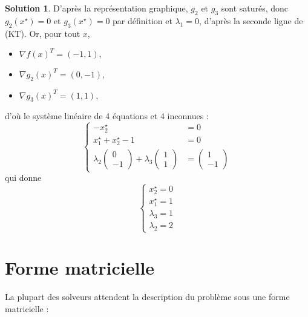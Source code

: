 \documentclass[a4paper,francais]{article}
\theoremstyle{definition}
\newtheorem*{solution}{Solution}
\begin{document}
\begin{solution}
  D'après la représentation graphique, $g_2$ et $g_3$ sont saturés, donc
  $g_2(x^\star) = 0$ et $g_3(x^\star) = 0$ par définition et $\lambda_1 = 0$,
  d'après la seconde ligne de (KT). Or, pour tout $x$,
  \begin{itemize}
  \item ${{\nabla f}(x)}^T = (-1,1)$,
  \item ${{\nabla g_2}(x)}^T = (0,-1)$,
  \item ${{\nabla g_3}(x)}^T = (1,1)$,
  \end{itemize}
  d'où le système linéaire de 4 équations et 4 inconnues : 
\[
\left\{
\begin{array}{ll}
  - x^\star_2 &= 0 \\
  x^\star_1 + x^\star_2 - 1 &= 0 \\
  \lambda_2 \left(\begin{array}{c} 0 \\ -1 \end{array}\right)
  + \lambda_3 \left(\begin{array}{c} 1 \\ 1 \end{array}\right)
  &= \left(\begin{array}{c} 1 \\ -1 \end{array}\right)
\end{array}
\right.
\]
qui donne
\[
\left\{
\begin{array}{l}
  x^\star_2 = 0 \\
  x^\star_1 = 1 \\
  \lambda_3 = 1 \\
  \lambda_2 = 2 
\end{array}
\right.
\]
\end{solution}

\section{Forme matricielle}
\label{sec:formes}

La plupart des solveurs attendent la description du problème sous une forme matricielle :
\end{document}
